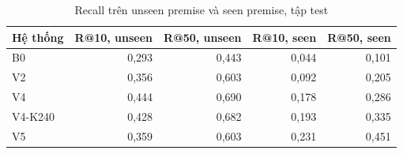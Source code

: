 \begin{table}[htbp]
\centering
\caption[Recall trên unseen premise và seen premise]{Recall trên unseen premise và seen premise, tập test }\label{tab:unseen}
\begin{tabular}{@{}lrrrr@{}}
\toprule
Hệ thống & R@10, unseen & R@50, unseen & R@10, seen & R@50, seen \\
\midrule
B0 & 0,293 & 0,443 & 0,044 & 0,101 \\
V2 & 0,356 & 0,603 & 0,092 & 0,205 \\
V4 & 0,444 & 0,690 & 0,178 & 0,286 \\
V4-K240 & 0,428 & 0,682 & 0,193 & 0,335 \\
V5 & 0,359 & 0,603 & 0,231 & 0,451 \\
\bottomrule
\end{tabular}
\par{}
\end{table}
